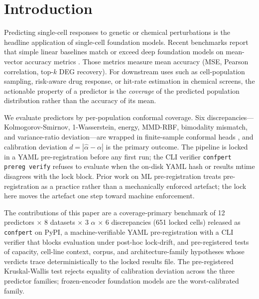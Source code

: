\documentclass{article}
\begin{document}
\section{Introduction}
Predicting single-cell responses to genetic or chemical perturbations
is the headline application of single-cell foundation models. Recent
benchmarks report that simple linear baselines match or exceed deep
foundation models on mean-vector accuracy metrics
\cite{ahlmann2025deep,csendes2025train,kedzierska2025zeroshot,boiarsky2024deeper}.
Those metrics measure mean accuracy (MSE, Pearson correlation,
top-$k$ DEG recovery). For downstream uses such as cell-population
sampling, risk-aware drug response, or hit-rate estimation in
chemical screens, the actionable property of a predictor is the
\emph{coverage} of the predicted population distribution rather than
the accuracy of its mean.

We evaluate predictors by per-population conformal coverage. Six
discrepancies---Kolmogorov-Smirnov, 1-Wasserstein, energy, MMD-RBF,
bimodality mismatch, and variance-ratio deviation---are wrapped in
finite-sample conformal heads
\cite{vovk2012,tibshirani2019,romano2019,izbicki2022,cauchois2021,bates2021},
and calibration deviation $d = |\hat\alpha - \alpha|$ is the primary
outcome. The pipeline is locked in a YAML pre-registration before any
first run; the CLI verifier \texttt{confpert prereg verify} refuses
to evaluate when the on-disk YAML hash or results mtime disagrees
with the lock block. Prior work on ML pre-registration
\cite{hofman2023prereg,pineau2020reproducibility} treats
pre-registration as a practice rather than a mechanically enforced
artefact; the lock here moves the artefact one step toward
machine enforcement.

The contributions of this paper are a coverage-primary benchmark of
12 predictors $\times$ 8 datasets $\times$ 3 $\alpha$ $\times$ 6
discrepancies (651 locked cells) released as \texttt{confpert} on
PyPI, a machine-verifiable YAML pre-registration with a CLI verifier
that blocks evaluation under post-hoc lock-drift, and pre-registered
tests of capacity, cell-line context, corpus, and architecture-family
hypotheses whose verdicts trace deterministically to the locked
results file. The pre-registered Kruskal-Wallis test rejects equality
of calibration deviation across the three predictor families;
frozen-encoder foundation models are the worst-calibrated family.
\end{document}

